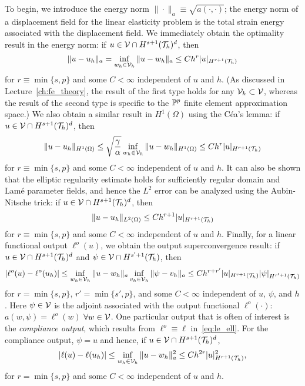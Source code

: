 To begin, we introduce the energy norm $\| \cdot \|_a \equiv \sqrt{a(\cdot,\cdot)}$; the energy norm of a displacement field for the linear elasticity problem is the total strain energy associated with the displacement field. We immediately obtain the optimality result in the energy norm: if $u \in \mathcal{V} \cap H^{s+1}(\mathcal{T}_h)^d$,  then
\begin{equation*}
  \| u - u_h \|_a = \inf_{w_h \in \mathcal{V}_h} \| u - w_h \|_a
  \leq C h^{r} | u |_{H^{r+1}(\mathcal{T}_h)}
\end{equation*}
for $r \equiv \min \{s, p \}$ and some $C < \infty$ independent of $u$ and $h$. (As discussed in Lecture~\ref{ch:fe_theory}, the result of the first type holds for any $\mathcal{V}_h \subset \mathcal{V}$, whereas the result of the second type is specific to the $\mathbb{P}^p$ finite element approximation space.) We also obtain a similar result in $H^1(\Omega)$ using the C\'ea's lemma: if $u \in \mathcal{V} \cap H^{s+1}(\mathcal{T}_h)^d$, then
\begin{equation*}
  \| u - u_h \|_{H^1(\Omega)} \leq \sqrt{\frac{\gamma}{\alpha}} \inf_{w_h \in \mathcal{V}_h} \| u - w_h \|_{H^1(\Omega)}
  \leq C h^{r} | u |_{H^{r+1}(\mathcal{T}_h)}
\end{equation*}
for $r \equiv \min \{s, p \}$ and some $C < \infty$ independent of $u$ and $h$.  It can also be shown that the elliptic regularity estimate holds for sufficiently regular domain and Lam\'e parameter fields, and hence the $L^2$ error can be analyzed using the Aubin-Nitsche trick: if $u \in \mathcal{V} \cap H^{s+1}(\mathcal{T}_h)^d$, then
\begin{equation*}
  \| u - u_h \|_{L^2(\Omega)} \leq C h^{r+1} | u |_{H^{r+1}(\mathcal{T}_h)}
\end{equation*}
for $r \equiv \min \{s, p \}$ and some $C < \infty$ independent of $u$ and $h$. Finally, for a linear functional output $\ell^o(u)$, we obtain the output superconvergence result: if $u \in \mathcal{V} \cap H^{s+1}(\mathcal{T}_h)^d$ and $\psi \in \mathcal{V} \cap H^{s'+1}(\mathcal{T}_h)$, then
\begin{equation*}
  | \ell^o(u) - \ell^o(u_h) |
  \leq \inf_{w_h \in \mathcal{V}_h} \| u - w_h \|_a \inf_{v_h \in \mathcal{V}_h} \| \psi - v_h \|_a \leq C h^{r + r'} | u |_{H^{r+1}(\mathcal{T}_h)} | \psi |_{H^{r'+1}(\mathcal{T}_h)}
\end{equation*}
for $r = \min\{ s,p \}$, $r' = \min\{s',p\}$, and some $C < \infty$ independent of $u$, $\psi$, and $h$.  Here $\psi \in \mathcal{V}$ is the adjoint associated with the output functional $\ell^o(\cdot)$: $a(w,\psi) = \ell^o(w)$ $\forall w \in \mathcal{V}$.  One particular output that is often of interest is the \emph{compliance output}, which results from $\ell^o \equiv \ell$ in~\eqref{eq:le_ell}. For the compliance output, $\psi  = u$ and hence, if $u \in \mathcal{V} \cap H^{s+1}(\mathcal{T}_h)^d$,
\begin{equation*}
  | \ell(u) - \ell(u_h)| \leq \inf_{w_h \in \mathcal{V}_h} \| u - w_h \|_a^2 \leq C h^{2r} | u |_{H^{r+1}(\mathcal{T}_h)}^2,
\end{equation*}
for $r = \min\{s,p\}$ and some $C < \infty$ independent of $u$ and $h$.

